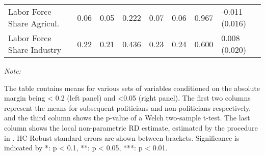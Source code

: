 \begin{table}[!h]
{\begin{threeparttable}
\begin{tabular}[t]{llllllll}
\hspace{1em}Labor Force Share Agricul. & \num{0.06} & \num{0.05} & 0.222 & \num{0.07} & \num{0.06} & 0.967 & -0.011 (0.016)\\
\hspace{1em}Labor Force Share Industry & \num{0.22} & \num{0.21} & 0.436 & \num{0.23} & \num{0.24} & 0.600 & 0.008 (0.020)\\
\bottomrule
\end{tabular}
\begin{tablenotes}[para]
\item \textit{Note: } 
\item The table contains means for various sets of variables conditioned on the absolute margin being < 0.2 (left panel) and <0.05 (right panel). The first two columns represent the means for subsequent politicians and non-politicians respectively, and the third column shows the p-value of a Welch two-sample t-test. The last column shows the local non-parametric RD estimate, estimated by the procedure in \cite{cattaneo2019practical}. HC-Robust standard errors are shown between brackets. Significance is indicated by *: p < 0.1, **: p < 0.05, ***: p < 0.01.
\end{tablenotes}
\end{threeparttable}}
\end{table}

